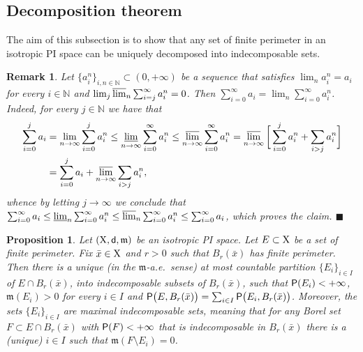 \documentclass[reqno]{amsart}
\numberwithin{equation}{section}
\newcommand{\N}{\mathbb{N}}
\newcommand{\X}{{\rm X}}
\newcommand{\sfd}{{\sf d}}
\newcommand{\mm}{\mathfrak m}
\newcommand{\1}{\mathbbm 1}
\newcommand{\limi}{\varliminf}
\newcommand{\lims}{\varlimsup}
\renewcommand{\P}{{\sf P}}
\newcommand{\fr}{\penalty-20\null\hfill\(\blacksquare\)}
\newtheorem{proposition}[theorem]{Proposition}
\newtheorem{remark}[theorem]{Remark}
\begin{document}
\subsection{Decomposition theorem}\label{ss:decomposition_thm}
%
%
The aim of this subsection is to show that any set of finite perimeter
in an isotropic PI space can be uniquely decomposed into indecomposable sets.
%
%
\begin{remark}\label{rmk:converg_sums}{\rm
Let \(\{a^n_i\}_{i,n\in\N}\subset(0,+\infty)\) be a sequence that satisfies
\(\lim_n a^n_i=a_i\) for every \(i\in\N\) and \(\lim_j\lims_n\sum_{i=j}^\infty a^n_i=0\).
Then \(\sum_{i=0}^\infty a_i=\lim_n\sum_{i=0}^\infty a_i^n\).
Indeed, for every \(j\in\N\) we have that
\[\begin{split}
\sum_{i=0}^j a_i&=\lim_{n\to\infty}\sum_{i=0}^j a^n_i
\leq\limi_{n\to\infty}\sum_{i=0}^\infty a^n_i
\leq\lims_{n\to\infty}\sum_{i=0}^\infty a^n_i
=\lims_{n\to\infty}\bigg[\sum_{i=0}^j a^n_i+\sum_{i>j}a^n_i\bigg]\\
&=\sum_{i=0}^j a_i+\lims_{n\to\infty}\sum_{i>j}a^n_i,
\end{split}\]
whence by letting \(j\to\infty\) we conclude that
\(\sum_{i=0}^\infty a_i\leq\limi_n\sum_{i=0}^\infty a^n_i
\leq\lims_n\sum_{i=0}^\infty a^n_i\leq\sum_{i=0}^\infty a_i\),
which proves the claim.
\fr}\end{remark}
%
%
\begin{proposition}\label{prop:decomposition_thm_aux}
Let \((\X,\sfd,\mm)\) be an isotropic PI space.
Let \(E\subset\X\) be a set of finite perimeter. Fix \(\bar x\in\X\) and
\(r>0\) such that \(B_r(\bar x)\) has finite perimeter. Then there is a unique
(in the \(\mm\)-a.e.\ sense) at most countable partition
\(\{E_i\}_{i\in I}\) of \(E\cap B_r(\bar x)\), into indecomposable subsets of
\(B_r(\bar x)\), such that \(\P(E_i)<+\infty\), \(\mm(E_i)>0\) for every \(i\in I\)
and \(\P\big(E,B_r(\bar x)\big)=\sum_{i\in I}\P\big(E_i,B_r(\bar x)\big)\).
Moreover, the sets \(\{E_i\}_{i\in I}\) are maximal indecomposable
sets, meaning that for any Borel set \(F\subset E\cap B_r(\bar x)\)
with \(\P(F)<+\infty\) that is indecomposable in \(B_r(\bar x)\) there
is a (unique) \(i\in I\) such that \(\mm(F\setminus E_i)=0\).
\end{proposition}
\end{document}
